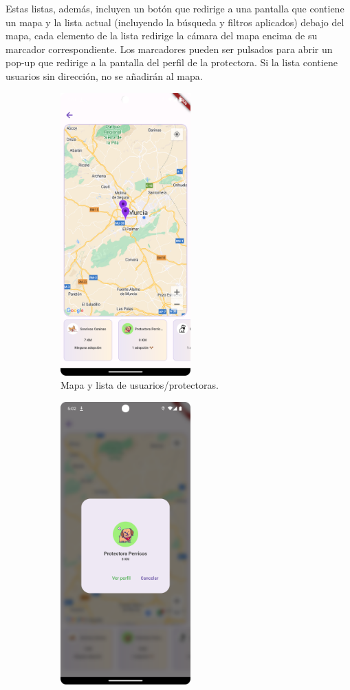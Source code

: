 \documentclass[a4paper, 12pt]{article}
\begin{document}
Estas listas, además, incluyen un botón que redirige a una pantalla que contiene un mapa y la lista actual (incluyendo la búsqueda y filtros aplicados) debajo del mapa, cada elemento de la lista redirige la cámara del mapa encima de su marcador correspondiente. Los marcadores pueden ser pulsados para abrir un pop-up que redirige a la pantalla del perfil de la protectora. Si la lista contiene usuarios sin dirección, no se añadirán al mapa.

\begin{figure}[H]
   	\begin{subfigure}{0.48\textwidth}
		\begin{center}
			{\includegraphics[width=5cm]{app/MapsPage.png}\par}
			\caption{Mapa y lista de usuarios/protectoras.}
		\end{center}  
	\end{subfigure}\hfill
   	\begin{subfigure}{0.48\textwidth}
		\begin{center}
			{\includegraphics[width=5cm]{app/MarkerClick.png}\par}

\end{center}
\end{subfigure}
\end{figure}
\end{document}
